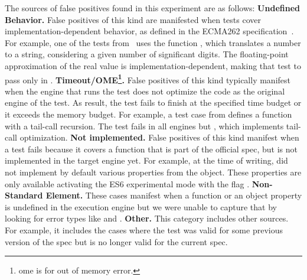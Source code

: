 \documentclass[sigconf,review, anonymous]{acmart}
\begin{document}
\sloppy The sources of false positives found in this experiment are as
follows: \textbf{Undefined Behavior.} False positives of this kind are
manifested when tests cover implementation-dependent behavior, as
defined in the ECMA262 specification~\cite{ecmas262-spec}. For
example, one of the tests from \jerry\ uses the function
, which translates a number to
a string, considering a given number of significant digits. The
floating-point approximation of the real value is
implementation-dependent, making that test to pass only in
\chakra. \textbf{Timeout/OME\footnote{ome is for out of memory
    error.}.} False positives of this kind typically manifest when the
engine that runs the test does not optimize the code as the original
engine of the test. As result, the test fails to finish at the
specified time budget or it exceeds the memory budget. For example, a
test case from \jsc{} defines a function with a tail-call
recursion. The test fails in all engines but \jsc{}, which implements
tail-call optimization. \textbf{Not implemented.} False positives of
this kind manifest when a test fails because it covers a function that
is part of the official spec, but is not implemented in the target
engine yet. For example, at the time of writing, \chakra{} did not
implement by default various properties from the 
object. These properties are only available activating the ES6
experimental mode with the flag .
\textbf{Non-Standard Element.} These cases manifest when a function or
an object property is undefined in the execution engine but we were
unable to capture that by looking for error types like
 and .
\textbf{Other.} This category includes other sources. For example, it
includes the cases where the test was valid for some previous version
of the spec but is no longer valid for the current spec.
\end{document}
